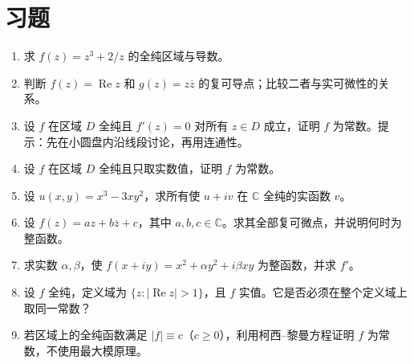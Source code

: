 \section{习题}
\label{sec:ca-derivative-ex}
\begin{enumerate}
 \item 求 $f(z)=z^3+2/z$ 的全纯区域与导数。
 \item 判断 $f(z)=\operatorname{Re}z$ 和 $g(z)=z\overline z$ 的复可导点；比较二者与实可微性的关系。
 \item 设 $f$ 在区域 $D$ 全纯且 $f'(z)=0$ 对所有 $z\in D$ 成立，证明 $f$ 为常数。提示：先在小圆盘内沿线段讨论，再用连通性。
 \item 设 $f$ 在区域 $D$ 全纯且只取实数值，证明 $f$ 为常数。
 \item 设 $u(x,y)=x^3-3xy^2$，求所有使 $u+iv$ 在 $\mathbb C$ 全纯的实函数 $v$。

  \item\label{ex:ca-affine} 设 $f(z)=az+b\overline z+c$，其中 $a,b,c\in\mathbb{C}$。求其全部复可微点，并说明何时为整函数。
  \item\label{ex:ca-c1-criterion} 求实数 $\alpha,\beta$，使 $f(x+iy)=x^2+\alpha y^2+i\beta xy$ 为整函数，并求 $f'$。
  \item\label{ex:ca-real-constant} 设 $f$ 全纯，定义域为 $\{z:|\operatorname{Re}z|>1\}$，且 $f$ 实值。它是否必须在整个定义域上取同一常数？
  \item\label{ex:ca-modulus-constant} 若区域上的全纯函数满足 $|f|\equiv c$（$c\ge0$），利用柯西--黎曼方程证明 $f$ 为常数，不使用最大模原理。
\end{enumerate}


